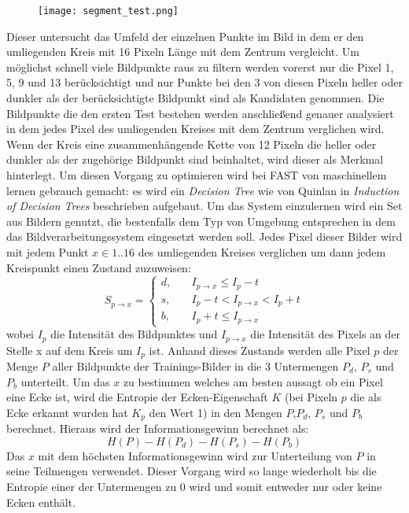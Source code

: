 \begin{figure}[h]
\texttt{[image: segment\_test.png]}
\centering
\end{figure}

Dieser untersucht das Umfeld der einzelnen Punkte im Bild in dem er den umliegenden Kreis mit 16 Pixeln Länge mit dem Zentrum vergleicht.
Um möglichst schnell viele Bildpunkte raus zu filtern werden vorerst nur die Pixel 1, 5, 9 und 13 berücksichtigt und nur Punkte bei den 3 von diesen Pixeln heller oder dunkler als der berücksichtigte Bildpunkt sind als Kandidaten genommen.
Die Bildpunkte die den ersten Test bestehen werden anschließend genauer analysiert in dem jedes Pixel des umliegenden Kreises mit dem Zentrum verglichen wird.
Wenn der Kreis eine zusammenhängende Kette von 12 Pixeln die heller oder dunkler als der zugehörige Bildpunkt sind beinhaltet, wird dieser als Merkmal hinterlegt.
Um diesen Vorgang zu optimieren wird bei FAST von maschinellem lernen gebrauch gemacht: es wird ein \emph{Decision Tree} wie von Quinlan in \emph{Induction of Decision Trees} beschrieben aufgebaut.
Um das System einzulernen wird ein Set aus Bildern genutzt, die bestenfalls dem Typ von Umgebung entsprechen in dem das Bildverarbeitungssystem eingesetzt werden soll.
Jedes Pixel dieser Bilder wird mit jedem Punkt $ x \in {1..16} $ des umliegenden Kreises verglichen um dann jedem Kreispunkt einen Zustand zuzuweisen:
\begin{equation}
S_{p\rightarrow x}=
\begin{cases}
d, & \quad I_{p\rightarrow x}\leq I_p - t\\
s, & \quad I_p - t < I_{p\rightarrow x} < I_p + t\\
b, & \quad I_p + t \leq I_{p\rightarrow x}
\end{cases}
\end{equation}
wobei $I_p$ die Intensität des Bildpunktes und $I_{p\rightarrow x}$ die Intensität des Pixels an der Stelle x auf dem Kreis um $I_p$ ist.
Anhand dieses Zustands werden alle Pixel $p$ der Menge $P$ aller Bildpunkte der Trainings-Bilder in die 3 Untermengen $P_d$, $P_s$ und $P_b$ unterteilt.
Um das $x$ zu bestimmen welches am besten aussagt ob ein Pixel eine Ecke ist, wird die Entropie der Ecken-Eigenschaft $K$ (bei Pixeln  $p$ die als Ecke erkannt wurden hat $K_p$ den Wert 1) in den Mengen $P$,$P_d$, $P_s$ und $P_b$ berechnet.
Hieraus wird der Informationsgewinn berechnet als:
\begin{equation}
H(P) - H(P_d) - H(P_s) - H(P_b)
\end{equation}
Das $x$ mit dem höchsten Informationsgewinn wird zur Unterteilung von $P$ in seine Teilmengen verwendet.
Dieser Vorgang wird so lange wiederholt bis die Entropie einer der Untermengen zu $0$ wird und somit entweder nur oder keine Ecken enthält.
